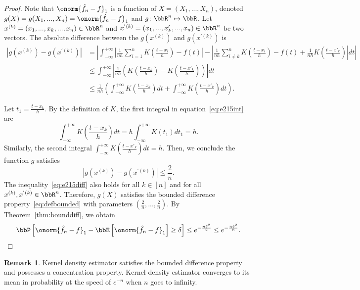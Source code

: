 \documentclass[11pt]{article}
\newcommand{\of}[1]{\left(#1\right)}
\newcommand{\off}[1]{\left[#1\right]}
\newcommand{\aabs}[1]{\left|#1\right|}
\theoremstyle{plain}
\theoremstyle{definition}
\newtheorem{rmk}{Remark}
\begin{document}
	\begin{proof}
		Note that $\onorm{\hat f_n - f}_1$ is a function of $X = (X_1,...,X_n)$, denoted $g(X) = g(X_1,...,X_n) = \onorm{\hat f_n - f}_1$ and $g\colon \bbR^n \mapsto \bbR$. Let $x^{(k)} = (x_1,...,x_k,...,x_n) \in \bbR^n$ and $x^{'(k)} = (x_1,...,x'_k,...,x_n)\in \bbR^n$ be two vectors. The absolute difference between the $g(x^{(k)})$ and $g(x^{'(k)})$ is
		\begin{align}
			|g(x^{(k)}) - g(x^{'(k)})|
			&= \aabs{\int_{-\infty}^{+\infty} \aabs{ \frac{1}{nh} \sum_{i = 1}^n K \of{\frac{t-x_i}{h}} -f(t)  } -\aabs{ \frac{1}{nh} \sum_{i \neq k}^n K \of{\frac{t-x_i}{h}} -f(t) + \frac{1}{nh} K\of{\frac{t-x'_k}{h}}   } dt} \\
			&\leq \int_{-\infty}^{+\infty} \aabs{\frac{1}{nh} \of{K\of{\frac{t-x_k}{h}} - K\of{\frac{t-x'_k}{h}}  } }dt\\
			&\leq \frac{1}{nh} \of{ \int_{-\infty}^{+\infty} K\of{\frac{t-x_k}{h}}dt + \int_{-\infty}^{+\infty} K\of{\frac{t-x'_k}{h}}dt }.  \label{eq:e215int}
		\end{align}
		
		Let $t_1 = \frac{t-x_k}{h}$. By the definition of $K$, the first integral in equation~\eqref{eq:e215int} are
		\begin{equation}
			\int_{-\infty}^{+\infty} K\of{\frac{t-x_k}{h}}dt = h\int_{-\infty}^{+\infty} K\of{t_1}dt_1 = h.
		\end{equation}
		Similarly, the second integral $\int_{-\infty}^{+\infty} K\of{\frac{t-x'_k}{h}}dt = h$. Then, we conclude the function $g$ satisfies
		\begin{equation}\label{eq:e215diff}
			|g(x^{(k)}) - g(x^{'(k)})|  \leq \frac{2}{n}.
		\end{equation}
		The inequality~\eqref{eq:e215diff} also holds for all $k \in [n]$ and for all $x^{(k)},x^{'(k)} \in \bbR^n$. Therefore, $g(X)$ satisfies the bounded difference property~\eqref{eq:defbounded} with parameters $(\frac{2}{n},..., \frac{2}{n})$. By Theorem~\ref{thm:bounddiff}, we obtain
		\begin{equation}
			\bbP\off{\onorm{\hat f_n - f}_1 - \bbE \off{\onorm{\hat f_n - f}_1} \geq \delta} \leq e^{-\frac{n\delta^2}{2}} \leq e^{-\frac{n\delta^2}{8}} .
		\end{equation}
		
	\end{proof}
	
	\begin{rmk}
		Kernel density estimator satisfies the bounded difference property and possesses a concentration property. Kernel density estimator converges to its mean in probability at the speed of $e^{-n}$ when $n$ goes to infinity.
	\end{rmk}
	
\end{document}
